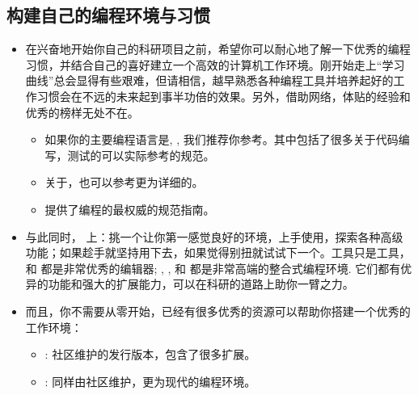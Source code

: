 \documentclass[letterpaper,10pt,english]{sphinxmanual}
\begin{document}
\subsection{构建自己的编程环境与习惯}
\label{\detokenize{resource/research/getting_started_cn:id7}}\begin{itemize}
\item {} 
在兴奋地开始你自己的科研项目之前，希望你可以耐心地了解一下优秀的编程习惯，并结合自己的喜好建立一个高效的计算机工作环境。刚开始走上“学习曲线”总会显得有些艰难，但请相信，越早熟悉各种编程工具并培养起好的工作习惯会在不远的未来起到事半功倍的效果。另外，借助网络，体贴的经验和优秀的榜样无处不在。
\begin{itemize}
\item {} 
如果你的主要编程语言是, ,
我们推荐你参考。其中包括了很多关于代码编写，测试的可以实际参考的规范。

\item {} 
关于，也可以参考更为详细的。

\item {} 
提供了编程的最权威的规范指南。

\end{itemize}

\item {} 
与此同时，
上：挑一个让你第一感觉良好的环境，上手使用，探索各种高级功能；如果趁手就坚持用下去，如果觉得别扭就试试下一个。工具只是工具，
和 
都是非常优秀的编辑器; ,
, 和
都是非常高端的整合式编程环境.
它们都有优异的功能和强大的扩展能力，可以在科研的道路上助你一臂之力。

\item {} 
而且，你不需要从零开始，已经有很多优秀的资源可以帮助你搭建一个优秀的工作环境：
\begin{itemize}
\item {} 
:
社区维护的发行版本，包含了很多扩展。

\item {} 
:
同样由社区维护，更为现代的编程环境。


\end{itemize}
\end{itemize}
\end{document}
